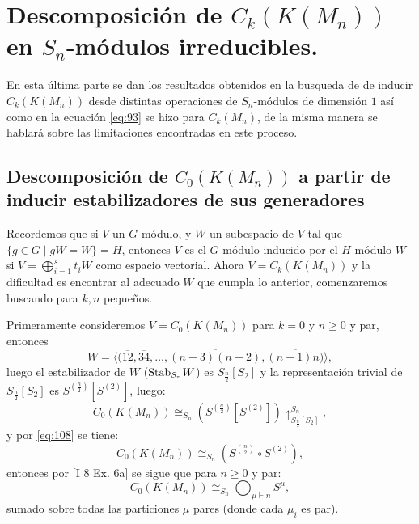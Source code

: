 \documentclass[12pt]{book}
\theoremstyle{definition}
\newcounter{in}
\begin{document}
\chapter{Descomposición de $C_{k}(K(M_n))$ en $S_{n}$-módulos irreducibles.}
\label{Des_esp_cad}
En esta última parte se dan los resultados obtenidos en la busqueda de de inducir $C_{k}(K(M_{n}))$ desde distintas operaciones de $S_{n}$-módulos de dimensión $1$ así como en la ecuación \ref{eq:93} se hizo para $C_{k}(M_{n})$, de la misma manera se hablará sobre las limitaciones encontradas en este proceso.


\section{Descomposición de $C_{0}(K(M_n))$ a partir de inducir estabilizadores de sus generadores}

\label{Ind_est_z}
  Recordemos que si $V$ un $G$-módulo, y $W$ un subespacio de $V$ tal que $\{g\in
  G\mid gW=W\}=H$, entonces $V$ es el $G$-módulo inducido por el $H$-módulo $W$ si
  $V=\bigoplus^{s}_{i=1}t_{i}W$ como espacio vectorial. Ahora $V = C_{k}(K(M_n))$ y la dificultad es encontrar al adecuado $W$ que cumpla lo anterior, comenzaremos buscando para $k,n$ pequeños.
  
  Primeramente consideremos $V = C_{0}(K(M_n))$ para $k=0$ y $n \geq 0$ y par, entonces
  $$W = \langle (\overline{12},\overline{34},\ldots,\overline{(n-3)(n-2)}, \overline{(n-1)n)} \rangle,$$
luego el estabilizador de $W$ ($\textup{Stab}_{S_{n}} W$) es $S_{\frac{n}{2}} \left [ S_{2} \right ]$ y la representación trivial de $S_{\frac{n}{2}} \left [ S_{2} \right ]$ es $S^{(\frac{n}{2})} \left [ S^{(2)} \right ]$, luego:
\begin{equation}
C_{0}(K(M_{n})) \cong_{S_{n}} (S^{(\frac{n}{2})} \left [ S^{(2)} \right ])\uparrow_{S_{\frac{n}{2}} \left [ S_{2} \right ]}^{S_{n}},
\end{equation}
y por \ref{eq:108} se tiene:
\begin{equation}
C_{0}(K(M_{n})) \cong_{S_{n}} (S^{(\frac{n}{2})} \circ S^{(2)}),
\end{equation}
entonces por \cite{macdonald1998symmetric} [I 8 Ex. 6a] se sigue que para $n \geq 0$ y par:
\begin{equation}
  \label{eq:97}
   C_{0}(K(M_n)) \cong_{S_{n}} \bigoplus_{\mu \vdash n} S^{\mu},
\end{equation}
sumado sobre todas las particiones $\mu$ pares (donde cada $\mu_{i}$ es par).
\end{document}
